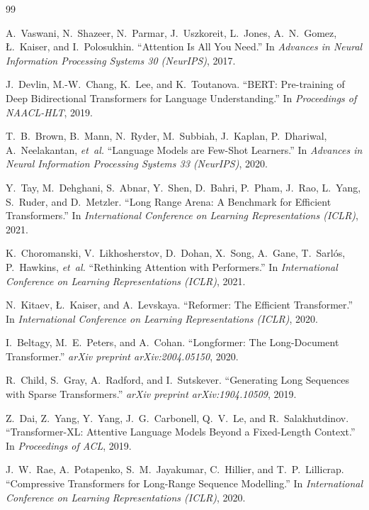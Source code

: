 \begin{thebibliography}{99}

A.~Vaswani, N.~Shazeer, N.~Parmar, J.~Uszkoreit, L.~Jones, A.~N.~Gomez, Ł.~Kaiser,
  and I.~Polosukhin.
``Attention Is All You Need.''
In \textit{Advances in Neural Information Processing Systems 30 (NeurIPS)}, 2017.

J.~Devlin, M.-W.~Chang, K.~Lee, and K.~Toutanova.
``BERT: Pre-training of Deep Bidirectional Transformers for Language Understanding.''
In \textit{Proceedings of NAACL-HLT}, 2019.

T.~B.~Brown, B.~Mann, N.~Ryder, M.~Subbiah, J.~Kaplan, P.~Dhariwal, A.~Neelakantan,
  \textit{et~al.}
``Language Models are Few-Shot Learners.''
In \textit{Advances in Neural Information Processing Systems 33 (NeurIPS)}, 2020.

Y.~Tay, M.~Dehghani, S.~Abnar, Y.~Shen, D.~Bahri, P.~Pham, J.~Rao, L.~Yang, S.~Ruder,
  and D.~Metzler.
``Long Range Arena: A Benchmark for Efficient Transformers.''
In \textit{International Conference on Learning Representations (ICLR)}, 2021.

K.~Choromanski, V.~Likhosherstov, D.~Dohan, X.~Song, A.~Gane, T.~Sarlós, P.~Hawkins,
  \textit{et~al.}
``Rethinking Attention with Performers.''
In \textit{International Conference on Learning Representations (ICLR)}, 2021.

N.~Kitaev, Ł.~Kaiser, and A.~Levskaya.
``Reformer: The Efficient Transformer.''
In \textit{International Conference on Learning Representations (ICLR)}, 2020.

I.~Beltagy, M.~E.~Peters, and A.~Cohan.
``Longformer: The Long-Document Transformer.''
\textit{arXiv preprint arXiv:2004.05150}, 2020.

R.~Child, S.~Gray, A.~Radford, and I.~Sutskever.
``Generating Long Sequences with Sparse Transformers.''
\textit{arXiv preprint arXiv:1904.10509}, 2019.

Z.~Dai, Z.~Yang, Y.~Yang, J.~G.~Carbonell, Q.~V.~Le, and R.~Salakhutdinov.
``Transformer-XL: Attentive Language Models Beyond a Fixed-Length Context.''
In \textit{Proceedings of ACL}, 2019.

J.~W.~Rae, A.~Potapenko, S.~M.~Jayakumar, C.~Hillier, and T.~P.~Lillicrap.
``Compressive Transformers for Long-Range Sequence Modelling.''
In \textit{International Conference on Learning Representations (ICLR)}, 2020.


\end{thebibliography}
